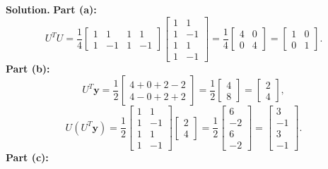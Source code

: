 \documentclass[11pt, letterpaper]{article}
\theoremstyle{definition}
\theoremstyle{remark}
\begin{document}
\textbf{Solution.}
\textbf{Part (a):}
\[
U^T U = \frac{1}{4}\begin{bmatrix} 1 & 1 & 1 & 1 \\ 1 & -1 & 1 & -1 \end{bmatrix}\begin{bmatrix} 1 & 1 \\ 1 & -1 \\ 1 & 1 \\ 1 & -1 \end{bmatrix} = \frac{1}{4}\begin{bmatrix} 4 & 0 \\ 0 & 4 \end{bmatrix} = \begin{bmatrix} 1 & 0 \\ 0 & 1 \end{bmatrix}.
\]
\textbf{Part (b):}
\[
U^T \mathbf{y} = \frac{1}{2}\begin{bmatrix} 4 + 0 + 2 - 2 \\ 4 - 0 + 2 + 2 \end{bmatrix} = \frac{1}{2}\begin{bmatrix} 4 \\ 8 \end{bmatrix} = \begin{bmatrix} 2 \\ 4 \end{bmatrix},
\]
\[
U(U^T \mathbf{y}) = \frac{1}{2}\begin{bmatrix} 1 & 1 \\ 1 & -1 \\ 1 & 1 \\ 1 & -1 \end{bmatrix}\begin{bmatrix} 2 \\ 4 \end{bmatrix} = \frac{1}{2}\begin{bmatrix} 6 \\ -2 \\ 6 \\ -2 \end{bmatrix} = \begin{bmatrix} 3 \\ -1 \\ 3 \\ -1 \end{bmatrix}.
\]
\textbf{Part (c):}
\end{document}
